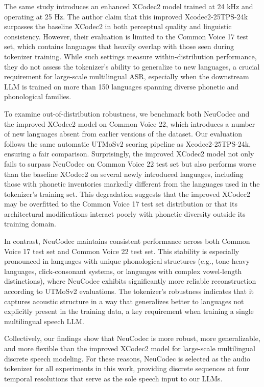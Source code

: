 \documentclass{article}
\begin{document}
The same study introduces an enhanced XCodec2 model trained at 24 kHz and operating at 25 Hz. The author claim that this improved Xcodec2-25TPS-24k surpasses the baseline XCodec2 in both perceptual quality and linguistic consistency. However, their evaluation is limited to the Common Voice 17 test set, which contains languages that heavily overlap with those seen during tokenizer training. While such settings measure within-distribution performance, they do not assess the tokenizer's ability to generalize to new languages, a crucial requirement for large-scale multilingual ASR, especially when the downstream LLM is trained on more than 150 languages spanning diverse phonetic and phonological families.

To examine out-of-distribution robustness, we benchmark both NeuCodec and the improved XCodec2 model on Common Voice 22, which introduces a number of new languages absent from earlier versions of the dataset. Our evaluation follows the same automatic UTMoSv2 scoring pipeline as Xcodec2-25TPS-24k, ensuring a fair comparison. Surprisingly, the improved XCodec2 model not only fails to surpass NeuCodec on Common Voice 22 test set but also performs worse than the baseline XCodec2 on several newly introduced languages, including those with phonetic inventories markedly different from the languages used in the tokenizer's training set. This degradation suggests that the improved XCodec2 may be overfitted to the Common Voice 17 test set distribution or that its architectural modifications interact poorly with phonetic diversity outside its training domain.

In contrast, NeuCodec maintains consistent performance across both Common Voice 17 test set and Common Voice 22 test set. This stability is especially pronounced in languages with unique phonological structures (e.g., tone-heavy languages, click-consonant systems, or languages with complex vowel-length distinctions), where NeuCodec exhibits significantly more reliable reconstruction according to UTMoSv2 evaluations. The tokenizer's robustness indicates that it captures acoustic structure in a way that generalizes better to languages not explicitly present in the training data, a key requirement when training a single multilingual speech LLM.

Collectively, our findings show that NeuCodec is more robust, more generalizable, and more flexible than the improved XCodec2 model for large-scale multilingual discrete speech modeling. For these reasons, NeuCodec is selected as the audio tokenizer for all experiments in this work, providing discrete sequences at four temporal resolutions that serve as the sole speech input to our LLMs.
\end{document}
